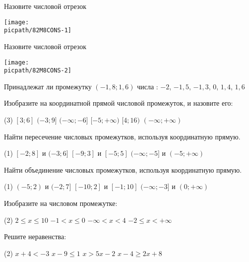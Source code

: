 \begin{consultation}[number=1]
	\begin{listofex}
		\item 
		\begin{minipage}[t]{\bodywidth}
			Назовите числовой отрезок
		\end{minipage}
		\hspace{0.02\linewidth}
		\begin{minipage}[t]{\picwidth}
			\texttt{[image: \\picpath/82M8CONS-1]}
		\end{minipage}
		\item 
		\begin{minipage}[t]{\bodywidth}
			Назовите числовой отрезок
		\end{minipage}
		\hspace{0.02\linewidth}
		\begin{minipage}[t]{\picwidth}
			\texttt{[image: \\picpath/82M8CONS-2]}
		\end{minipage}
		\item Принадлежат ли промежутку \( (-1,8;1,6) \) числа : \( -2 \), \( -1,5 \), \( -1,3 \), \( 0 \), \( 1,4 \), \( 1,6 \)
		\item Изобразите на координатной прямой числовой промежуток, и назовите его:
		\begin{tasks}(3)
			\task \( [3;6] \)
			\task \( (-3;9] \)
			\task \( (-\infty;-6] \)
			\task \( [-5;+\infty) \)
			\task \( [4;16) \)
			\task \( (-\infty;+\infty )\)
		\end{tasks}
		\item Найти пересечение числовых промежутков, используя координатную прямую.
		\begin{tasks}(1)
			\task \( [-2;8] \) и \( (-3;6] \)
			\task \( [-9;3] \) и \( [-5;5] \)
			\task \( (-\infty;-5] \) и \( (-5;+\infty) \)
		\end{tasks}
		\item Найти объединение числовых промежутков, используя координатную прямую.
		\begin{tasks}(1)
			\task \( (-5;2) \) и \( (-2;7] \)
			\task \( [-10;2] \) и \( [-1;10] \)
			\task \( (-\infty;-3] \) и \( (0;+\infty) \)
		\end{tasks}
		\item Изобразите на числовом промежутке:
		\begin{tasks}(2)
			\task \( 2\leq x\leq 10\)
			\task \( -1< x\leq 0\)
			\task \( -\infty < x< 4\)
			\task \( -2\leq x<+\infty \)
		\end{tasks}
		\item Решите неравенства:
		\begin{tasks}(2)
			\task \( x+4<-3 \)
			\task \( x-9\leq 1 \)
			\task \( x>5x-2\)
			\task \( x-4\geq 2x+8\)
		\end{tasks}
	\end{listofex}
\end{consultation}
